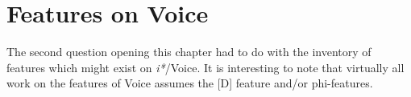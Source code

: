 %
%
%


\section{Features on Voice} \label{i:agree}
The second question opening this chapter had to do with the inventory of features which might exist on \textit{i*}/Voice. It is interesting to note that virtually all work on the features of Voice assumes the [D] feature and/or phi-features.

